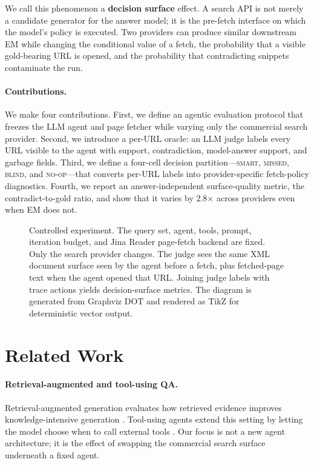\documentclass[11pt]{article}
\newcommand{\smart}{\textsc{smart}}
\newcommand{\missed}{\textsc{missed}}
\newcommand{\blind}{\textsc{blind}}
\newcommand{\noop}{\textsc{no-op}}
\begin{document}
We call this phenomenon a \textbf{decision surface} effect. A search API is not merely a candidate generator for the answer model; it is the pre-fetch interface on which the model's policy is executed. Two providers can produce similar downstream EM while changing the conditional value of a fetch, the probability that a visible gold-bearing URL is opened, and the probability that contradicting snippets contaminate the run.

\paragraph{Contributions.} We make four contributions.
First, we define an agentic evaluation protocol that freezes the LLM agent and page fetcher while varying only the commercial search provider. Second, we introduce a per-URL oracle: an LLM judge labels every URL visible to the agent with support, contradiction, model-answer support, and garbage fields. Third, we define a four-cell decision partition---\smart{}, \missed{}, \blind{}, and \noop{}---that converts per-URL labels into provider-specific fetch-policy diagnostics. Fourth, we report an answer-independent surface-quality metric, the contradict-to-gold ratio, and show that it varies by 2.8$\times$ across providers even when EM does not.

\begin{figure}[t]
\centering
\resizebox{0.98\textwidth}{!}{}
\caption{Controlled experiment. The query set, agent, tools, prompt, iteration budget, and Jina Reader page-fetch backend are fixed. Only the search provider changes. The judge sees the same XML document surface seen by the agent before a fetch, plus fetched-page text when the agent opened that URL. Joining judge labels with trace actions yields decision-surface metrics. The diagram is generated from Graphviz DOT and rendered as TikZ for deterministic vector output.}
\label{fig:architecture}
\end{figure}


\section{Related Work}
\label{sec:related}

\paragraph{Retrieval-augmented and tool-using QA.}
Retrieval-augmented generation evaluates how retrieved evidence improves knowledge-intensive generation \citep{lewis-etal-2020-retrieval,izacard-grave-2021-leveraging}. Tool-using agents extend this setting by letting the model choose when to call external tools \citep{yao2023react,schick-etal-2023-toolformer}. Our focus is not a new agent architecture; it is the effect of swapping the commercial search surface underneath a fixed agent.
\end{document}
